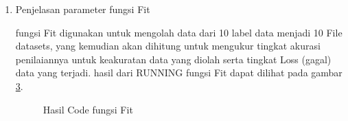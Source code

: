 \begin{enumerate}
\subitem fungsi Compile digunakan untuk melakukan proses yang akan mengecek data parameter yang akan digunakan dari data yang telah diolah dari proses Sequential. hasil dari RUNNING pada fungsi Compile dapat dilihat pada gambar \ref{f16}

\begin{figure}[!htbp]
      \caption{Hasil Code fungsi Compile}
      \label{f16}
\end{figure}

\subitem pada gambar \ref{f17} adalah hasil dari penjelasan tentang data Sequential dan Compile

\begin{figure}[!htbp]
      \caption{Hasil Code Program Summary}
      \label{f17}
\end{figure}

\item Penjelasan parameter fungsi Fit



\subitem fungsi Fit digunakan untuk mengolah data dari 10 label data menjadi 10 File datasets, yang kemudian akan dihitung untuk mengukur tingkat akurasi penilaiannya untuk keakuratan data yang diolah serta tingkat Loss (gagal) data yang terjadi. hasil dari RUNNING fungsi Fit dapat dilihat pada gambar \ref{f18}.

\begin{figure}[!htbp]
      \caption{Hasil Code fungsi Fit}
      \label{f18}
\end{figure}


\end{enumerate}
